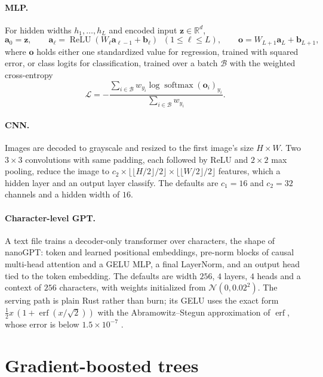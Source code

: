 \documentclass[11pt]{article}
\theoremstyle{plain}
\theoremstyle{definition}
\newcommand{\R}{\mathbb{R}}
\newcommand{\relu}{\operatorname{ReLU}}
\newcommand{\softmax}{\operatorname{softmax}}
\begin{document}
\paragraph{MLP.} For hidden widths $h_1, \ldots, h_L$ and encoded input
$\bm{z} \in \R^{d}$,
\begin{equation}\label{eq:mlp}
  \bm{a}_0 = \bm{z}, \qquad
  \bm{a}_\ell = \relu(W_\ell \bm{a}_{\ell-1} + \bm{b}_\ell) \;\; (1 \le \ell \le L), \qquad
  \bm{o} = W_{L+1} \bm{a}_L + \bm{b}_{L+1},
\end{equation}
where $\bm{o}$ holds either one standardized value for regression, trained
with squared error, or class logits for classification, trained over a batch
$\mathcal{B}$ with the weighted cross-entropy
\begin{equation}\label{eq:wce}
  \mathcal{L} = -\frac{\sum_{i \in \mathcal{B}} w_{y_i}\log\softmax(\bm{o}_i)_{y_i}}{\sum_{i \in \mathcal{B}} w_{y_i}}.
\end{equation}

\paragraph{CNN.} Images are decoded to grayscale and resized to the first
image's size $H \times W$. Two $3\times3$ convolutions with same padding, each
followed by ReLU and $2\times2$ max pooling, reduce the image to
$c_2 \times \lfloor\lfloor H/2\rfloor/2\rfloor \times \lfloor\lfloor W/2\rfloor/2\rfloor$
features, which a hidden layer and an output layer classify. The defaults are
$c_1 = 16$ and $c_2 = 32$ channels and a hidden width of $16$.

\paragraph{Character-level GPT.} A text file trains a decoder-only transformer
over characters, the shape of nanoGPT: token and learned positional
embeddings, pre-norm blocks of causal multi-head attention and a GELU MLP, a
final LayerNorm, and an output head tied to the token embedding. The defaults
are width $256$, $4$ layers, $4$ heads and a context of $256$ characters, with
weights initialized from $\mathcal{N}(0, 0.02^2)$. The serving path is plain
Rust rather than burn; its GELU uses the exact form
$\tfrac12 x\,(1 + \operatorname{erf}(x/\sqrt{2}))$ with the Abramowitz--Stegun
approximation of $\operatorname{erf}$, whose error is below
$1.5 \times 10^{-7}$ \cite{abramowitz}.

\section{Gradient-boosted trees}\label{sec:gbdt}
\end{document}
